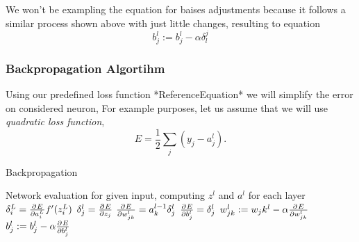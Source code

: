 We won't be exampling the equation for baises adjustments because it follows a similar process shown above with just little changes, resulting to equation
\[  b_{j}^l := b_{j}^l - \alpha\delta_l^{j} \]

\subsubsection{Backpropagation Algortihm}

\clearpage

Using our predefined loss function *ReferenceEquation* we will simplify the error on considered neuron,
For example purposes, let us assume that we will use \textit{quadratic loss function},
\[  E =  \frac{1}{2}\sum_j(y_j - a_j^l).  \]

\begin{algorithm}
\caption{Backpropagation}\label{euclid}
\begin{algorithmic}[1]
\State Network evaluation for given input, computing $z^l$ and $a^l$ for each layer
  \State $\delta_i^L = \frac{\partial^{} E}{\partial a_i^L}f'(z_i^L)$
\EndFor
{}
    \State $\delta_j^l = \frac{\partial^{} E}{\partial z_j}$
  \EndFor
\EndFor
\State $\frac{\partial^{} E}{\partial w_{jk}^l} = a_k^{l-1}\delta_j^l$
\State $\frac{\partial^{} E}{\partial b_j^l} = \delta_j^l$
\State $w_{jk}^l := w_jk^l - \alpha\frac{\partial^{} E}{\partial w_{jk}^l}$
\State $b_j^l := b_j^l - \alpha\frac{\partial^{} E}{\partial b_j^l}$
\end{algorithmic}
\end{algorithm}
